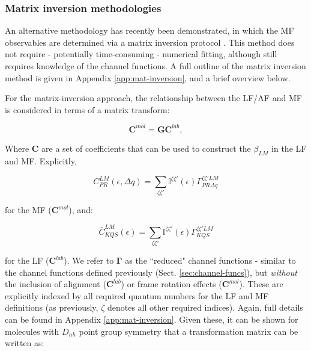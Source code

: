 \subsubsection{Matrix inversion methodologies\label{sec:matrix-inv-intro}}

An alternative methodology has recently been demonstrated, in which the MF observables are determined via a matrix inversion protocol \cite{gregory2021MolecularFramePhotoelectron}. This method does not require - potentially time-consuming - numerical fitting, although still requires knowledge of the channel functions. A full outline of the matrix inversion method is given in Appendix \ref{app:mat-inversion}, and a brief overview below.

For the matrix-inversion approach, the relationship between the LF/AF and MF is considered in terms of a matrix transform:

\begin{equation}
\mathbf{C}^{mol}=\mathbf{G}\mathbf{C}^{lab},\label{eq:basic}
\end{equation}

Where $\mathbf{C}$ are a set of coefficients that can be used to construct the $\beta_{LM}$ in the LF and MF. Explicitly, 


\begin{equation}
C_{PR}^{LM}(\epsilon,\Delta q)=\sum_{\zeta\zeta'}\mathbb{I}^{\zeta\zeta'}(\epsilon)\Gamma_{PR\Delta q}^{\zeta\zeta'LM}
\end{equation}

for the MF ($\mathbf{C}^{mol}$), and:

\begin{equation}
\bar{C}_{KQS}^{LM}(\epsilon)=\sum_{\zeta\zeta'}\mathbb{I}^{\zeta\zeta'}(\epsilon)\Gamma_{KQS}^{\zeta\zeta'LM}
\label{eq:C-AF}
\end{equation}

for the LF ($\mathbf{C}^{lab}$). We refer to $\mathbf{\Gamma}$ as the ``reduced" channel functions - similar to the channel functions defined previously (Sect. \ref{sec:channel-funcs}), but \textit{without} the inclusion of alignment ($\mathbf{C}^{lab}$) or frame rotation effects ($\mathbf{C}^{mol}$). These are explicitly indexed by all required quantum numbers for the LF and MF definitions (as previously, $\zeta$ denotes all other required indices). Again, full details can be found in Appendix \ref{app:mat-inversion}. Given these, it can be shown for molecules with $D_{nh}$ point group symmetry that a transformation matrix can be written as:

